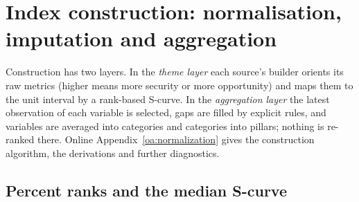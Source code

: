 
\section{Index construction: normalisation, imputation and aggregation}\label{sec:normalization}

Construction has two layers. In the \emph{theme layer} each source's builder orients its raw
metrics (higher means more security or more opportunity) and maps them to the unit interval by a
rank-based S-curve. In the \emph{aggregation layer} the latest observation of each variable is
selected, gaps are filled by explicit rules, and variables are averaged into categories and
categories into pillars; nothing is re-ranked there. Online Appendix~\ref{oa:normalization} gives
the construction algorithm, the derivations and further diagnostics.

\subsection{Percent ranks and the median S-curve}\label{subsec:scurve}

